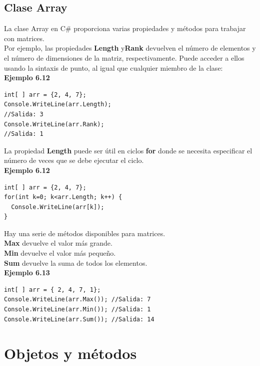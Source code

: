 \documentclass[12pt,a4paper]{report}
\begin{document}
\section{Clase Array}
La clase Array en C\# proporciona varias propiedades y métodos para trabajar con matrices.\\Por ejemplo, las propiedades \textbf{Length} y\textbf{Rank} devuelven el número de elementos y el número de dimensiones de la matriz, respectivamente. Puede acceder a ellos usando la sintaxis de punto, al igual que cualquier miembro de la clase:\\\textbf{Ejemplo 6.12}
\begin{lstlisting}
int[ ] arr = {2, 4, 7};
Console.WriteLine(arr.Length); 
//Salida: 3
Console.WriteLine(arr.Rank); 
//Salida: 1
\end{lstlisting}La propiedad\textbf{ Length} puede ser útil en ciclos\textbf{ for} donde se necesita especificar el número de veces que se debe ejecutar el ciclo.\\\textbf{Ejemplo 6.12}
\begin{lstlisting}
int[ ] arr = {2, 4, 7};
for(int k=0; k<arr.Length; k++) {
  Console.WriteLine(arr[k]);
}
\end{lstlisting}Hay una serie de métodos disponibles para matrices.\\\textbf{Max} devuelve el valor más grande.\\\textbf{Min} devuelve el valor más pequeño.\\\textbf{Sum} devuelve la suma de todos los elementos.\\\textbf{Ejemplo 6.13}
\begin{lstlisting}
int[ ] arr = { 2, 4, 7, 1};
Console.WriteLine(arr.Max()); //Salida: 7
Console.WriteLine(arr.Min()); //Salida: 1
Console.WriteLine(arr.Sum()); //Salida: 14
\end{lstlisting}
\chapter{Objetos y métodos}
\end{document}
